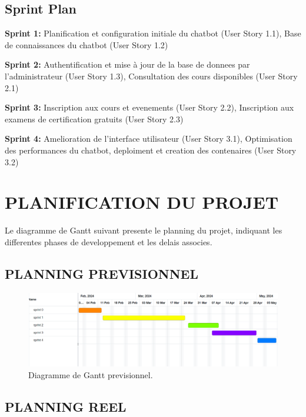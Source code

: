 \documentclass[a4paper, 11pt, openany]{report}
\begin{document}
\subsection{Sprint Plan}

\textbf{Sprint 1:} Planification et configuration initiale du chatbot (User Story 1.1), Base de connaissances du chatbot (User Story 1.2)

\textbf{Sprint 2:} Authentification et mise à jour de la base de donnees par l'administrateur (User Story 1.3), Consultation des cours disponibles (User Story 2.1)

\textbf{Sprint 3:} Inscription aux cours et evenements (User Story 2.2), Inscription aux examens de certification gratuits (User Story 2.3)

\textbf{Sprint 4:} Amelioration de l'interface utilisateur (User Story 3.1), Optimisation des performances du chatbot, deploiment et creation des contenaires (User Story 3.2)


\section{PLANIFICATION DU PROJET}
Le diagramme de Gantt suivant presente le planning du projet, indiquant les differentes phases de developpement et les delais associes.



\subsection{PLANNING PREVISIONNEL}

\begin{figure}[h!]
\centering
\includegraphics[width=\textwidth]{assets/images/gant-prev.png}
\caption{Diagramme de Gantt previsionnel.}
\label{fig:prev-gantt}
\end{figure}


\clearpage





\subsection{PLANNING REEL}
\end{document}
